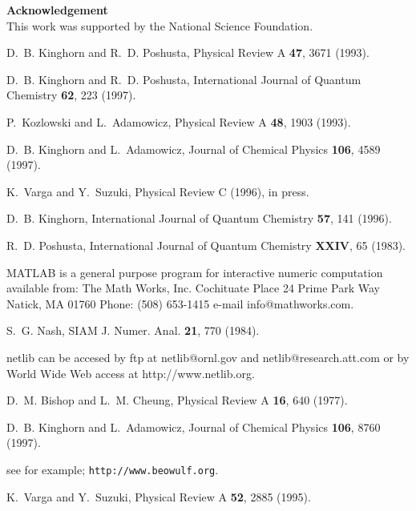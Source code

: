 \documentclass[12pt]{article}
\newtheorem{acknowledgement}[theorem]{Acknowledgement}
\begin{document}
\vspace{.25in}
\noindent
\large{\bf{Acknowledgement}} \normalsize \\
This work was supported by the National Science Foundation.

\begin{thebibliography}{10}

D.~B. Kinghorn and R.~D. Poshusta,
\newblock Physical Review A {\bf 47}, 3671 (1993).

D.~B. Kinghorn and R.~D. Poshusta,
\newblock International Journal of Quantum Chemistry {\bf 62}, 223 (1997).

P.~Kozlowski and L.~Adamowicz,
\newblock Physical Review A {\bf 48}, 1903 (1993).

D.~B. Kinghorn and L.~Adamowicz,
\newblock Journal of Chemical Physics {\bf 106}, 4589 (1997).

K.~Varga and Y.~Suzuki,
\newblock Physical Review C  (1996),
\newblock in press.

D.~B. Kinghorn,
\newblock International Journal of Quantum Chemistry {\bf 57}, 141 (1996).

R.~D. Poshusta,
\newblock International Journal of Quantum Chemistry {\bf XXIV}, 65 (1983).

MATLAB is a general purpose program for interactive numeric computation
  available from: The Math Works, Inc. Cochituate Place 24 Prime Park Way
  Natick, MA 01760 Phone: (508) 653-1415 e-mail info@mathworks.com.

S.~G. Nash,
\newblock SIAM J. Numer. Anal. {\bf 21}, 770 (1984).

netlib can be accesed by ftp at netlib@ornl.gov and netlib@research.att.com or
  by World Wide Web access at http://www.netlib.org.

D.~M. Bishop and L.~M. Cheung,
\newblock Physical Review A {\bf 16}, 640 (1977).

D.~B. Kinghorn and L.~Adamowicz,
\newblock Journal of Chemical Physics {\bf 106}, 8760 (1997).

see for example; {\tt http://www.beowulf.org}.

K.~Varga and Y.~Suzuki,
\newblock Physical Review A {\bf 52}, 2885 (1995).

\end{thebibliography}
\end{document}
